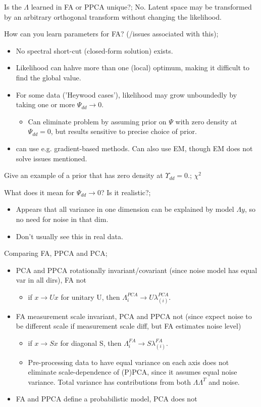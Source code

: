\documentclass{article}
\begin{document}
Is the $\Lambda$ learned in FA or PPCA unique?; No. Latent space may be transformed by an arbitrary orthogonal transform without changing the likelihood.

How can you learn parameters for FA? (/issues associated with this); \begin{itemize} \item No spectral short-cut (closed-form solution) exists.  \item Likelihood can hahve more than one (local) optimum, making it difficult to find the global value.  \item For some data ('Heywood cases'), likelihood may grow unboundedly by taking one or more $\Psi_{dd}\rightarrow 0$.  \begin{itemize} \item Can eliminate problem by assuming prior on $\Psi$ with zero density at $\Psi_{dd}=0$, but results sensitive to precise choice of prior.  \end{itemize} \item can use e.g. gradient-based methods. Can also use EM, though EM does not solve issues mentioned.  \end{itemize}

Give an example of a prior that has zero density at $\Upsilon_{dd}=0$.; $\chi^2$ 

What does it mean for $\Psi_{dd}\rightarrow 0$? Is it realistic?; \begin{itemize} \item Appears that all variance in one dimension can be explained by model $\Lambda y$, so no need for noise in that dim.  \item Don't usually see this in real data.  \end{itemize}

Comparing FA, PPCA and PCA; \begin{itemize} \item PCA and PPCA rotationally invariant/covariant (since noise model has equal var in all dirs), FA not \begin{itemize} \item if $x\rightarrow Ux$ for unitary U, then $\Lambda^{PCA}_{i}\rightarrow U \lambda^{PCA}_{(i)}$.  \end{itemize} \item FA measurement scale invariant, PCA and PPCA not (since expect noise to be different scale if measurement scale diff, but FA estimates noise level) \begin{itemize} \item if $x\rightarrow Sx$ for diagonal S, then $\Lambda^{FA}_{i}\rightarrow S \lambda^{FA}_{(i)}$.  \item Pre-processing data to have equal variance on each axis does not eliminate scale-dependence of (P)PCA, since it assumes equal noise variance. Total variance has contributions from both $\Lambda\Lambda^T$ and noise.  \end{itemize} \item FA and PPCA define a probabilistic model, PCA does not
\end{itemize}
\end{document}
